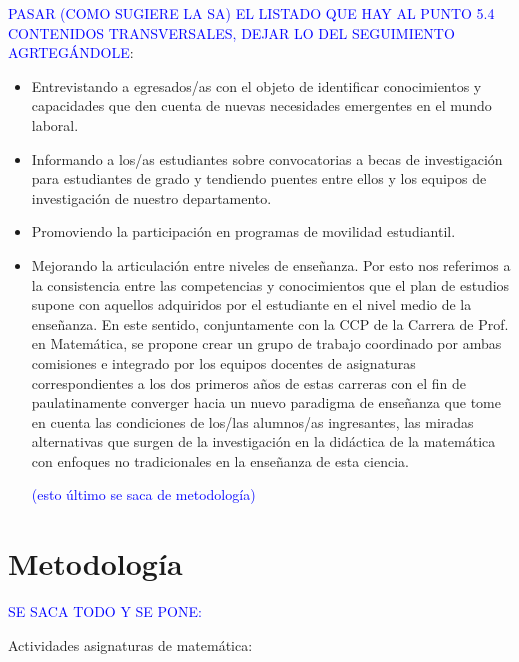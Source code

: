 \documentclass[a4paper, 12pt]{article}
\begin{document}
\textcolor{blue}{ PASAR (COMO SUGIERE LA SA) EL LISTADO QUE HAY AL PUNTO 5.4 CONTENIDOS TRANSVERSALES, DEJAR LO DEL SEGUIMIENTO AGRTEGÁNDOLE}:

\begin{itemize}

\item Entrevistando a egresados/as con el objeto de identificar conocimientos  y capacidades que den cuenta de nuevas  necesidades  emergentes en el mundo laboral.

\item Informando a los/as  estudiantes sobre convocatorias a becas de investigación para estudiantes de grado y tendiendo puentes entre ellos y los equipos de investigación de nuestro departamento. 

\item Promoviendo la participación en programas de movilidad estudiantil. 

\item Mejorando la articulación entre niveles de enseñanza. Por esto nos referimos a la consistencia entre  las competencias y conocimientos que el plan de estudios supone con aquellos   adquiridos por el estudiante en el  nivel medio de  la enseñanza. En este sentido, conjuntamente con la CCP de la Carrera de Prof. en Matemática, se propone crear un grupo de trabajo coordinado por ambas comisiones e integrado por los equipos docentes de asignaturas correspondientes a los dos primeros años de estas carreras con el fin de paulatinamente converger hacia un nuevo paradigma de enseñanza que tome en cuenta las condiciones de los/las alumnos/as ingresantes, las  miradas alternativas que surgen de la investigación en la didáctica de la matemática con enfoques no tradicionales en la enseñanza  de esta ciencia. 

\textcolor{blue}{(esto último se saca de  metodología)}

\end{itemize}

\section{Metodología}
\textcolor{blue}{SE SACA TODO Y SE PONE:}


Actividades asignaturas de matemática:
\end{document}
